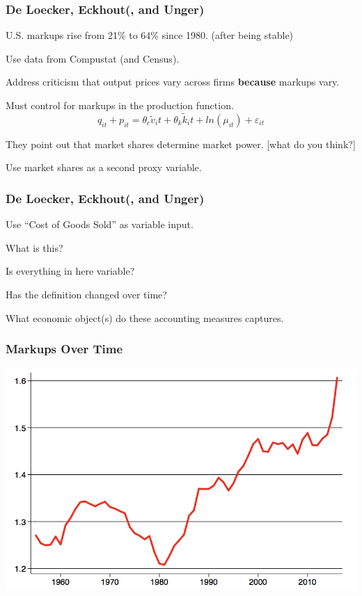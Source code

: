 \documentclass[11pt, aspectratio=169]{beamer}
\newenvironment{wideitemize}{\itemize\addtolength{\itemsep}{10pt}}{\enditemize}
\begin{document}
\begin{frame}[c]\frametitle{De Loecker, Eckhout(, and Unger)}

\begin{wideitemize}
	\item U.S. markups rise from 21\% to 64\% since 1980. (after being stable)
	\item Use data from Compustat (and Census). 
	\item Address criticism that output prices vary across firms \textbf{because} markups vary. 
	\begin{wideitemize}
		\item Must control for markups in the production function.
		$$q_{it} + p_{it} = \theta_c \tilde{v}_it + \theta_k \tilde{k}_it + ln(\mu_{it}) + \varepsilon_{it}$$		
	\end{wideitemize}
	\item They point out that market shares determine market power. [what do you think?]
	\item Use market shares as a second proxy variable.
\end{wideitemize}
    
\end{frame}


\begin{frame}[c]\frametitle{De Loecker, Eckhout(, and Unger)}
	\begin{wideitemize}
	       	\item Use ``Cost of Goods Sold'' as variable input. 
	       	\item What is this? 
	       	\begin{wideitemize}
	       	 	\item Is everything in here variable?
	       	 	\item Has the definition changed over time?
	       	 \end{wideitemize}	 
	       	 \item What economic object(s) do these accounting measures captures.	       	       	
	\end{wideitemize}	                      
\end{frame}    


\begin{frame}[c]\frametitle{Markups Over Time}
    \centering
    \includegraphics[scale=.7]{DLE1.png}


\end{frame}
\end{document}
